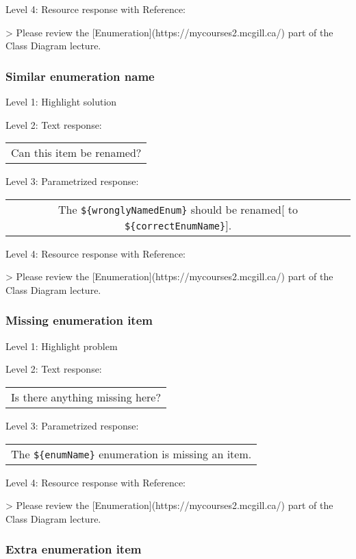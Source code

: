 \noindent Level 4: Resource response with Reference:

> Please review the [Enumeration](https://mycourses2.mcgill.ca/) part of the Class Diagram lecture.


\subsubsection{Similar enumeration name}

\noindent Level 1: Highlight solution \medskip

\noindent Level 2: Text response: \medskip

\begin{tabular}{|c}
Can this item be renamed?
\end{tabular} \medskip

\noindent Level 3: Parametrized response: \medskip

\begin{tabular}{|c}
The \verb|${wronglyNamedEnum}| should be renamed[ to \verb|${correctEnumName}|].
\end{tabular} \medskip

\noindent Level 4: Resource response with Reference:

> Please review the [Enumeration](https://mycourses2.mcgill.ca/) part of the Class Diagram lecture.


\subsubsection{Missing enumeration item}

\noindent Level 1: Highlight problem \medskip

\noindent Level 2: Text response: \medskip

\begin{tabular}{|c}
Is there anything missing here?
\end{tabular} \medskip

\noindent Level 3: Parametrized response: \medskip

\begin{tabular}{|c}
The \verb|${enumName}| enumeration is missing an item.
\end{tabular} \medskip

\noindent Level 4: Resource response with Reference:

> Please review the [Enumeration](https://mycourses2.mcgill.ca/) part of the Class Diagram lecture.


\subsubsection{Extra enumeration item}

